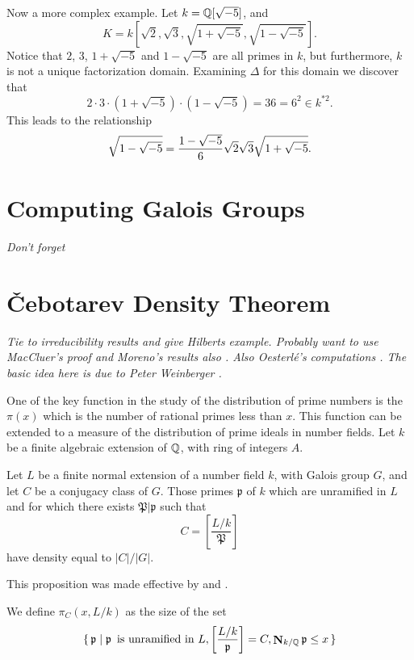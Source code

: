 \medskip
Now a more complex example.  Let $k = \mathbb{Q}[\sqrt{-5}]$, and 
\[
K = k[\sqrt{2}, \sqrt{3}, \sqrt{1+\sqrt{-5}}, \sqrt{1-\sqrt{-5}}].
\]
Notice that $2$, $3$, $1+\sqrt{-5}$ and $1-\sqrt{-5}$ are all primes in
$k$, but furthermore, $k$ is not a unique factorization domain.
Examining $\Delta$ for this domain we discover that
\[
2\cdot 3\cdot(1+\sqrt{-5})\cdot(1-\sqrt{-5})= 36 
  = 6^2 \in k^{\ast2}.
\]
This leads to the relationship
\[
\sqrt{1-\sqrt{-5}} 
  = {1 - \sqrt{-5} \over 6} \sqrt{2} \sqrt{3} \sqrt{1+\sqrt{-5}}.
\]

\section{Computing Galois Groups}

{\em Don't forget \cite{Mckay79}}

\section{\v{C}ebotarev Density Theorem}
\label{Cebotarev:Sec}

{\em Tie to irreducibility results and give Hilberts example.
Probably want to use MacCluer's proof \cite{MacCluer68} and Moreno's
results also \cite{Moreno:Chebotarev}.  Also Oesterl\'e's computations
\cite{Oesterle79}.  The basic idea here is due to Peter Weinberger
\cite{Weinberger84}.} 


One of the key function in the study of the distribution of prime
numbers is the $\pi(x)$ which is the number of rational primes less
than $x$.  This function can be extended to a measure of the
distribution of prime ideals in number fields.  Let $k$ be a finite
algebraic extension of $\mathbb{Q}$, with ring of integers $A$.

\begin{proposition}[\Chebotarev] 
\label{Cebotarev:Density:Prop}
Let $L$ be a finite normal extension of a number field $k$, with Galois
group $G$, and let $C$ be a conjugacy class of $G$.  Those primes $\mathfrak{p}$ of $k$ which are unramified in $L$ and for which there exists $\mathfrak{P} |\mathfrak{p}$ such that
\[
C = \left[\frac{L/k}{\mathfrak{P}}\right]
\]
have density equal to $|C|/|G|$.
\end{proposition}

This proposition was made effective by {\Lagarias} and {\Odlyzko}
\cite{Lagarias77}.

We define $\pi_{C}(x, L/k)$ as the size of the set
\[
\{\, {\frak p} \mid {\frak p} \enspace\mbox{is unramified in $L$},
\left[\frac{L/k}{\frak p}\right] = C, \mathop{\mathbf{N}}\nolimits_{k/\mathbb{Q}}{\frak p} \le x\,\}
\]

